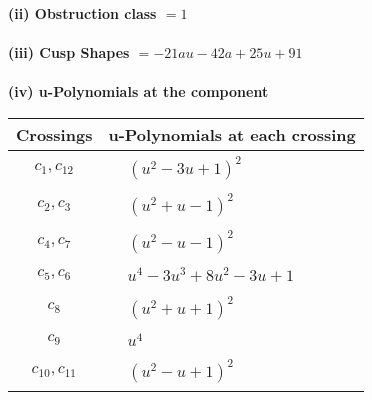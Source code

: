 \documentclass[1p]{elsarticle_modified}
\theoremstyle{definition}
\begin{document}
\flushleft \textbf{(ii) Obstruction class $= 1$}\\~\\
\flushleft \textbf{(iii) Cusp Shapes $= -21 a u-42 a+25 u+91$}\\~\\
\newpage\renewcommand{\arraystretch}{1}
\flushleft \textbf{(iv) u-Polynomials at the component}\newline \\
\begin{tabular}{m{50pt}|m{274pt}}
Crossings & \hspace{64pt}u-Polynomials at each crossing \\
\hline $$\begin{aligned}c_{1},c_{12}\end{aligned}$$&$\begin{aligned}
&(u^2-3 u+1)^2
\end{aligned}$\\
\hline $$\begin{aligned}c_{2},c_{3}\end{aligned}$$&$\begin{aligned}
&(u^2+u-1)^2
\end{aligned}$\\
\hline $$\begin{aligned}c_{4},c_{7}\end{aligned}$$&$\begin{aligned}
&(u^2- u-1)^2
\end{aligned}$\\
\hline $$\begin{aligned}c_{5},c_{6}\end{aligned}$$&$\begin{aligned}
&u^4-3 u^3+8 u^2-3 u+1
\end{aligned}$\\
\hline $$\begin{aligned}c_{8}\end{aligned}$$&$\begin{aligned}
&(u^2+u+1)^2
\end{aligned}$\\
\hline $$\begin{aligned}c_{9}\end{aligned}$$&$\begin{aligned}
&u^4
\end{aligned}$\\
\hline $$\begin{aligned}c_{10},c_{11}\end{aligned}$$&$\begin{aligned}
&(u^2- u+1)^2
\end{aligned}$\\
\hline
\end{tabular}\\~\\
\end{document}
